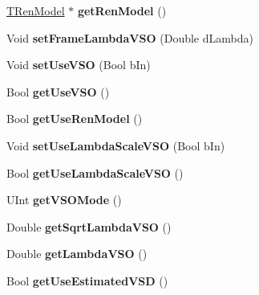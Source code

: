 \begin{DoxyCompactItemize}
\item 
\mbox{\label{class_t_com_rd_cost_a99f397ae6ec8fd6692c888c8e066e4d0}} 
\hyperlink{class_t_ren_model}{T\+Ren\+Model} $\ast$ {\bfseries get\+Ren\+Model} ()
\item 
\mbox{\label{class_t_com_rd_cost_aae864af2e6bf63e30a4c8bcaee22a4ba}} 
Void {\bfseries set\+Frame\+Lambda\+V\+SO} (Double d\+Lambda)
\item 
\mbox{\label{class_t_com_rd_cost_a2b0ae5c3ee8455eb2fdfba20eebcebea}} 
Void {\bfseries set\+Use\+V\+SO} (Bool b\+In)
\item 
\mbox{\label{class_t_com_rd_cost_a1ea5ca0b7eeac028d011c8c70b34ffe9}} 
Bool {\bfseries get\+Use\+V\+SO} ()
\item 
\mbox{\label{class_t_com_rd_cost_ae0b97e8070a6e3fa0106d67204a5a297}} 
Bool {\bfseries get\+Use\+Ren\+Model} ()
\item 
\mbox{\label{class_t_com_rd_cost_af3295fbada15b39205089a4190f8f5d1}} 
Void {\bfseries set\+Use\+Lambda\+Scale\+V\+SO} (Bool b\+In)
\item 
\mbox{\label{class_t_com_rd_cost_aa6b17b7f6e103dd3ab4bf338ec935a53}} 
Bool {\bfseries get\+Use\+Lambda\+Scale\+V\+SO} ()
\item 
\mbox{\label{class_t_com_rd_cost_a75b4a2f7e4157a188214e065c74cf12c}} 
U\+Int {\bfseries get\+V\+S\+O\+Mode} ()
\item 
\mbox{\label{class_t_com_rd_cost_aa7c64e1fd36376337aad4fbceff10fe9}} 
Double {\bfseries get\+Sqrt\+Lambda\+V\+SO} ()
\item 
\mbox{\label{class_t_com_rd_cost_af4df712b89d92065f8f94679775bb6b6}} 
Double {\bfseries get\+Lambda\+V\+SO} ()
\item 
\mbox{\label{class_t_com_rd_cost_a46bfd1f3c226c0d8a8ad7a3fadd756b1}} 
Bool {\bfseries get\+Use\+Estimated\+V\+SD} ()
\item 

\end{DoxyCompactItemize}
